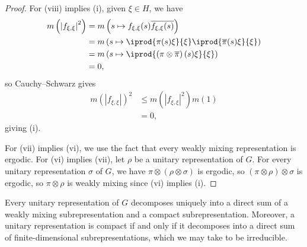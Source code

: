 \documentclass[10pt]{mypackage}
\begin{document}
\begin{proof}
For (viii) implies (i), given $\xi\in H$, we have
\begin{align*}
  m\left( \left\vert f_{\xi,\xi} \right\vert^2 \right) &= m\left( s\mapsto f_{\xi,\xi}(s) \overline{f_{\xi,\xi}(s)} \right)\\
                                                       &= m\left( s\mapsto \iprod{\pi(s)\xi}{\xi} \iprod{ \overline{\pi}(s)\xi }{\xi} \right)\\
                                                       &= m\left( s\mapsto \iprod{\left( \pi\otimes \overline{\pi} \right)(s)\xi}{\xi} \right)\\
                                                       &= 0,
\end{align*}
so Cauchy--Schwarz gives
\begin{align*}
  m\left( \left\vert f_{\xi,\xi} \right\vert \right)^2 &\leq m\left( \left\vert f_{\xi,\xi} \right\vert^2 \right)m\left( 1 \right)\\
                                                       &= 0,
\end{align*}
giving (i).

For (vii) implies (vi), we use the fact that every weakly mixing representation is ergodic. For (vi) implies (vii), let $\rho$ be a unitary representation of $G$. For every unitary representation $\sigma$ of $G$, we have $\pi\otimes \left( \rho\otimes\sigma \right)$ is ergodic, so $ \left( \pi\otimes\rho \right)\otimes \sigma $ is ergodic, so $\pi\otimes\rho$ is weakly mixing since (vi) implies (i).
\end{proof}
\begin{theorem}
  Every unitary representation of $G$ decomposes uniquely into a direct sum of a weakly mixing subrepresentation and a compact subrepresentation. Moreover, a unitary representation is compact if and only if it decomposes into a direct sum of finite-dimensional subrepresentations, which we may take to be irreducible.
\end{theorem}
\end{document}
